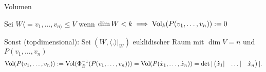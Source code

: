 \documentclass[class=article, crop=false]{standalone}
\begin{document}
\begin{zettel}{Volumen}

\begin{definition}

Sei $W \langle =v_1,\dots,v_{n\rangle}\leq  V$ wenn $\dim W < k \implies  \operatorname{Vol}_k (P (v_1,\dots,v_n)) := 0$ 

Sonst (topdimensional):
Sei $ (W, \langle .\rangle|_{W})$ euklidischer Raum mit $\dim V =n$ und $P (v_1,\dots,v_n)$ 
\[
\operatorname{Vol} (P (v_1,\dots,v_n)) := \operatorname{Vol} (\Phi_B^{-1} (P( v_1,\dots,v_n))) = \operatorname{Vol} (P (\dot{x}_1,\dots,\dot{x}_n)) = \det |\begin{pmatrix} \dot{x}_1 |& \dots |& \dot{x}_n \end{pmatrix}|
.\]

\end{definition}

\end{zettel}
\end{document}
